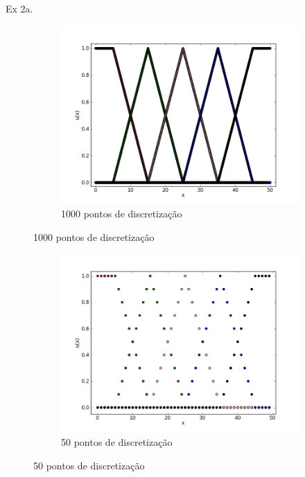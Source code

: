 \documentclass{report}
\begin{document}
\newpage

Ex 2a.
\begin{figure}[h]
        \begin{subfigure}[b]{0.6\textwidth}
                \centering
                \includegraphics[width=\textwidth]{ex1b1000.png}
	\caption{1000 pontos de discretização}
        \end{subfigure}
\end{figure}
\begin{figure}[h]
	\begin{subfigure}[b]{0.6\textwidth}
                \centering
                \includegraphics[width=\textwidth]{ex2a50.png}
	\caption{50 pontos de discretização}
	\end{subfigure}
\end{figure}
\end{document}
